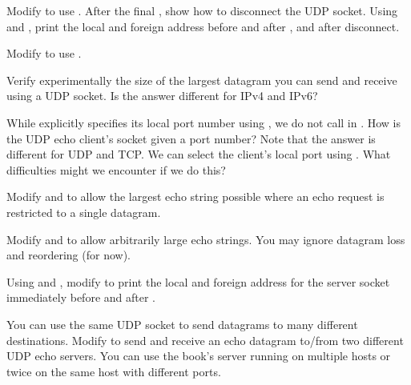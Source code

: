 \begin{exercises}

\item Modify  to use .
After the final , show how to disconnect 
the UDP socket.  Using 
 and , print the local and 
foreign address before and after , and after disconnect.

\item Modify  to use .

\item Verify experimentally the size of the largest datagram you can send
and receive using a UDP socket.  Is the answer different for IPv4 and IPv6?

\item While  explicitly specifies its local port
number using , we do not call  in
. How is the UDP echo client's socket given a port
number? Note that the answer is different for UDP and TCP.  We can select the
client's local port using .  What difficulties might we
encounter if we do this?

\item Modify  and  to
allow the largest echo string possible where an echo request is
restricted to a single datagram.

\item Modify  and  to
allow arbitrarily large echo strings. You may ignore datagram loss and
reordering (for now).

\item Using  and ,
modify  to print the local and foreign address
for the server socket immediately before and after
.

\item You can use the same UDP socket to send datagrams to many different
destinations.  Modify  to send and receive an echo
datagram to/from two different UDP echo servers.  You can use the book's server
running on multiple hosts or twice on the same host with different ports.

\end{exercises}

